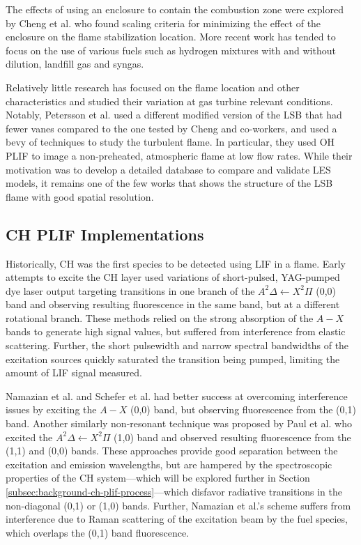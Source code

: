 The effects of using an enclosure to contain the combustion zone were explored by Cheng et al.\cite{2008-cheng-c} who found scaling criteria for minimizing the effect of the enclosure on the flame stabilization location. 
More recent work has tended to focus on the use of various fuels such as hydrogen mixtures\cite{2008-cheng-b} with and without dilution\cite{2007-littlejohn}, landfill gas\cite{2008-cheng-a,2009-cheng} and syngas\cite{2010-littlejohn}.

Relatively little research has focused on the flame location and other characteristics and studied their variation at gas turbine relevant conditions.
Notably, Petersson et al.\cite{2007-petersson} used a different modified version of the LSB that had fewer vanes compared to the one tested by Cheng and co-workers, and used a bevy of techniques to study the turbulent flame.
In particular, they used OH PLIF to image a non-preheated, atmospheric flame at low flow rates.
While their motivation was to develop a detailed database to compare and validate LES models, it remains one of the few works that shows the structure of the LSB flame with good spatial resolution.

\subsection{CH PLIF Implementations}

Historically, CH was the first species to be detected using LIF in a flame.\cite{1973-barnes}
Early attempts\cite{1981-verdieck,1986-allen} to excite the CH layer used variations of short-pulsed, YAG-pumped dye laser output targeting transitions in one branch of the \(A^2\Delta\leftarrow X^2\Pi\) (0,0) band and observing resulting fluorescence in the same band, but at a different rotational branch.
These methods relied on the strong absorption of the \(A-X\) bands to generate high signal values, but suffered from interference from elastic scattering.
Further, the short pulsewidth and narrow spectral bandwidths of the excitation sources quickly saturated the transition being pumped, limiting the amount of LIF signal measured.

Namazian et al.\cite{1986-namazian} and Schefer et al.\cite{1994-schefer} had better success at overcoming interference issues by exciting the \(A-X\) (0,0) band, but observing fluorescence from the (0,1) band.
Another similarly non-resonant technique was proposed by Paul et al.\cite{1994-paul} who excited the \(A^2\Delta\leftarrow X^2\Pi\) (1,0) band and observed resulting fluorescence from the (1,1) and (0,0) bands.
These approaches provide good separation between the excitation and emission wavelengths, but are hampered by the spectroscopic properties of the CH system---which will be explored further in Section \ref{subsec:background-ch-plif-process}---which disfavor radiative transitions in the non-diagonal (0,1) or (1,0) bands.
Further, Namazian et al.'s scheme suffers from interference due to Raman scattering of the excitation beam by the fuel species, which overlaps the (0,1) band fluorescence.

